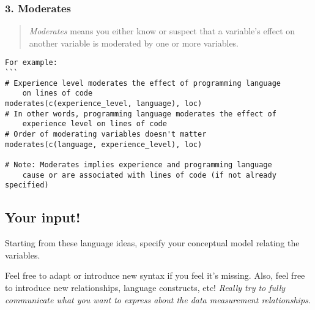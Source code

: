 \subsubsection{3. Moderates}

\begin{quote}
\emph{Moderates} means you either know or suspect that a variable's
effect on another variable is moderated by one or more variables.
\end{quote}

\begin{verbatim}
For example:
```
# Experience level moderates the effect of programming language 
    on lines of code
moderates(c(experience_level, language), loc)
# In other words, programming language moderates the effect of 
    experience level on lines of code
# Order of moderating variables doesn't matter
moderates(c(language, experience_level), loc)

# Note: Moderates implies experience and programming language 
    cause or are associated with lines of code (if not already specified)
\end{verbatim}

\subsection*{Your input!}

Starting from these language ideas, specify your conceptual model
relating the variables.

Feel free to adapt or introduce new syntax if you feel it's missing.
Also, feel free to introduce new relationships, language constructs,
etc! \emph{Really try to fully communicate what you want to express
about the data measurement relationships.}
\clearpage

